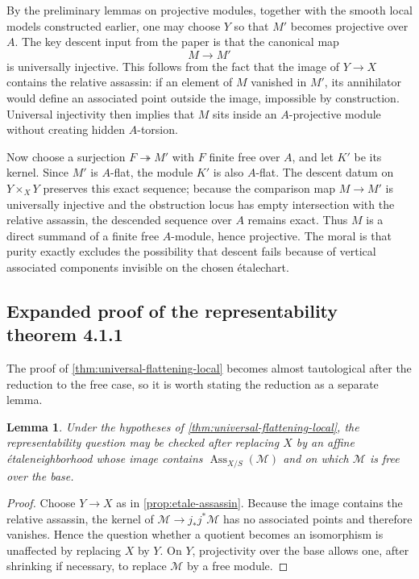 \documentclass[11pt,oneside]{article}
\newtheorem{lemma}[theorem]{Lemma}
\newcommand{\M}{\mathcal M}
\newcommand{\Ass}{\operatorname{Ass}}
\newcommand{\etale}{\'etale}
\begin{document}
By the preliminary lemmas on projective modules, together with the smooth local models constructed earlier, one may choose $Y$ so that $M'$ becomes projective over $A$.  The key descent input from the paper is that the canonical map
\[
M\longrightarrow M'
\]
is universally injective.  This follows from the fact that the image of $Y\to X$ contains the relative assassin: if an element of $M$ vanished in $M'$, its annihilator would define an associated point outside the image, impossible by construction.  Universal injectivity then implies that $M$ sits inside an $A$-projective module without creating hidden $A$-torsion.

Now choose a surjection $F\twoheadrightarrow M'$ with $F$ finite free over $A$, and let $K'$ be its kernel.  Since $M'$ is $A$-flat, the module $K'$ is also $A$-flat.  The descent datum on $Y\times_X Y$ preserves this exact sequence; because the comparison map $M\to M'$ is universally injective and the obstruction locus has empty intersection with the relative assassin, the descended sequence over $A$ remains exact.  Thus $M$ is a direct summand of a finite free $A$-module, hence projective.  The moral is that purity exactly excludes the possibility that descent fails because of vertical associated components invisible on the chosen \etale chart.

\subsection{Expanded proof of the representability theorem 4.1.1}

The proof of \cref{thm:universal-flattening-local} becomes almost tautological after the reduction to the free case, so it is worth stating the reduction as a separate lemma.

\begin{lemma}\label{lem:reduce-free}
Under the hypotheses of \cref{thm:universal-flattening-local}, the representability question may be checked after replacing $X$ by an affine \etale neighborhood whose image contains $\Ass_{X/S}(\M)$ and on which $\M$ is free over the base.
\end{lemma}

\begin{proof}
Choose $Y\to X$ as in \cref{prop:etale-assassin}.  Because the image contains the relative assassin, the kernel of $\M\to j_*j^*\M$ has no associated points and therefore vanishes.  Hence the question whether a quotient becomes an isomorphism is unaffected by replacing $X$ by $Y$.  On $Y$, projectivity over the base allows one, after shrinking if necessary, to replace $\M$ by a free module.
\end{proof}
\end{document}
